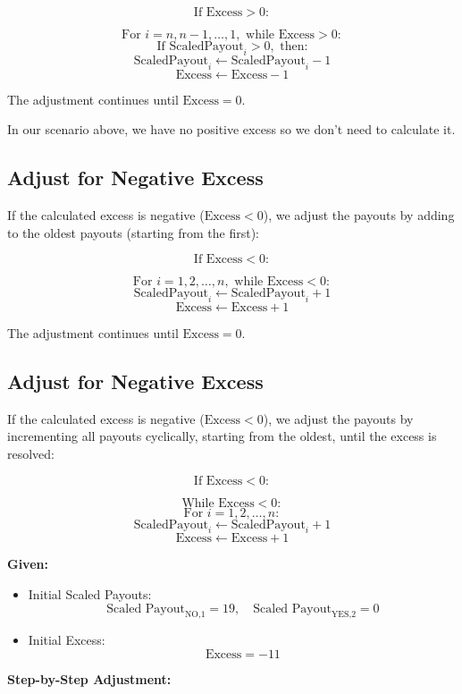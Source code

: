 \documentclass{article}
\begin{document}
\[
\text{If Excess} > 0:
\]

\[
\text{For } i = n, n-1, \dots, 1, \text{ while Excess} > 0:
\]
\[
\text{If ScaledPayout}_i > 0, \text{ then:}
\]
\[
\text{ScaledPayout}_i \gets \text{ScaledPayout}_i - 1
\]
\[
\text{Excess} \gets \text{Excess} - 1
\]

The adjustment continues until \(\text{Excess} = 0\).

In our scenario above, we have no positive excess so we don't need to calculate it.

\subsection*{Adjust for Negative Excess}

If the calculated excess is negative (\(\text{Excess} < 0\)), we adjust the payouts by adding to the oldest payouts (starting from the first):

\[
\text{If Excess} < 0:
\]

\[
\text{For } i = 1, 2, \dots, n, \text{ while Excess} < 0:
\]
\[
\text{ScaledPayout}_i \gets \text{ScaledPayout}_i + 1
\]
\[
\text{Excess} \gets \text{Excess} + 1
\]

The adjustment continues until \(\text{Excess} = 0\).

\subsection*{Adjust for Negative Excess}

If the calculated excess is negative (\(\text{Excess} < 0\)), we adjust the payouts by incrementing all payouts cyclically, starting from the oldest, until the excess is resolved:

\[
\text{If Excess} < 0:
\]

\[
\text{While Excess} < 0:
\]
\[
\text{For } i = 1, 2, \dots, n:
\]
\[
\text{ScaledPayout}_i \gets \text{ScaledPayout}_i + 1
\]
\[
\text{Excess} \gets \text{Excess} + 1
\]

\textbf{Given:}

\begin{itemize}
    \item Initial Scaled Payouts:
    \[
    \text{Scaled Payout}_{\text{NO,1}} = 19, \quad \text{Scaled Payout}_{\text{YES,2}} = 0
    \]
    \item Initial Excess:
    \[
    \text{Excess} = -11
    \]
\end{itemize}

\textbf{Step-by-Step Adjustment:}
\end{document}
